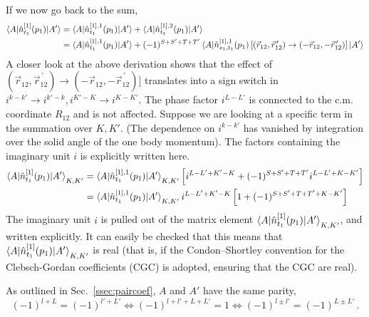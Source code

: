 \documentclass[10pt]{article}
\begin{document}
If we now go back to the sum,
\begin{align*}
	\braket{ A | \hat{n}_{t_1}^{[1]}(p_1) | A'} &= \braket{ A | 
\hat{n}_{t_1}^{[1],1}(p_1) | A'} + \braket{ A | \hat{n}_{t_1}^{[1],2}(p_1) | 
A'} \\
	&= \braket{ A | \hat{n}_{t_1}^{[1],1}(p_1) | A'} + (-1)^{S+S'+T+T'} 
\braket{ A | \hat{n}^{[1],1}_{s_1,t_1}(p_1) \left[ ( \vec{r}_{12}, 
\vec{r}_{12}^{\, \prime} ) \rightarrow ( - \vec{r}_{12}, - \vec{r}_{12}^{\, 
\prime} ) \right] | A'} 
\end{align*}
A closer look at the above derivation shows that the effect of $ ( 
\vec{r}_{12}, \vec{r}_{12}^{\, \prime} ) \rightarrow ( - \vec{r}_{12}, - 
\vec{r}_{12}^{\, \prime} )]$ translates into a sign switch in $i^{k-k'} 
\rightarrow i^{k'-k}, i^{K'-K} \rightarrow i^{K-K'}$.
The phase factor $i^{L-L'}$ is connected to the c.m. coordinate $R_{12}$ and is 
not affected.
Suppose we are looking at a specific term in the summation over $K,K'$. (The 
dependence on $i^{k-k'}$ has vanished by integration over the solid angle of 
the one body momentum).
The factors containing the imaginary unit $i$ is explicitly written here.
\begin{align*}
	\braket{ A | \hat{n}_{t_1}^{[1]}(p_1) | A'}_{K,K'} &= \braket{ A | 
\hat{n}_{t_1}^{[1],1}(p_1) | A'}_{K,K'} \left[ i^{L-L'+K'-K} + (-1)^{S+S'+T+T'} 
i^{L-L'+K-K'} \right] \\
	&= \braket{ A | \hat{n}_{t_1}^{[1],1}(p_1) | A'}_{K,K'} i^{L-L' + K'-K} 
\left[ 1 + (-1)^{S+S'+T+T'+K-K'} \right]
\end{align*}
The imaginary unit $i$ is pulled out of the matrix element $\braket{ A | 
\hat{n}_{t_1}^{[1]}(p_1) | A'}_{K,K'}$, and written explicitly. It can easily 
be checked that this means that $\braket{ A | \hat{n}_{t_1}^{[1]}(p_1) | 
A'}_{K,K'}$ is real (that is, if the Condon–Shortley convention for the 
Clebsch-Gordan coefficients (CGC) is adopted, ensuring that the CGC are real).

As outlined in Sec.~\ref{ssec:paircoef}, $A$ and $A'$ have the same parity,
\begin{equation}
	(-1)^{l+L} = (-1)^{l'+L'} \Leftrightarrow (-1)^{l+l'+L+L'} = 1 
\Leftrightarrow (-1)^{l \pm l'} = (-1)^{L \pm L'}  \, .
	\label{eq:parity_phase_id}
\end{equation}
\end{document}
